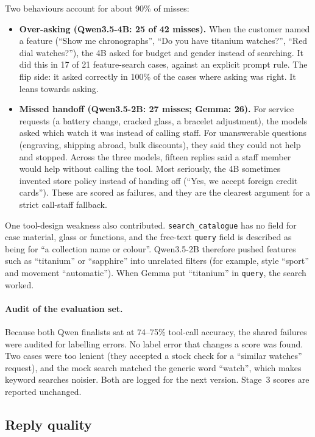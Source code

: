 \documentclass[11pt,a4paper]{article}
\begin{document}
Two behaviours account for about 90\% of misses:
\begin{itemize}
  \item \textbf{Over-asking (Qwen3.5-4B: 25 of 42 misses).} When the customer named a feature (``Show me chronographs'',
        ``Do you have titanium watches?'', ``Red dial watches?''), the 4B asked for budget and gender instead of
        searching. It did this in 17 of 21 feature-search cases, against an explicit prompt rule. The flip side: it
        asked correctly in 100\% of the cases where asking was right. It leans towards asking.
  \item \textbf{Missed handoff (Qwen3.5-2B: 27 misses; Gemma: 26).} For service requests (a battery change, cracked
        glass, a bracelet adjustment), the models asked which watch it was instead of calling staff. For unanswerable
        questions (engraving, shipping abroad, bulk discounts), they said they could not help and stopped. Across the three models, fifteen
        replies said a staff member would help without calling the tool. Most seriously, the 4B sometimes invented
        store policy instead of handing off (``Yes, we accept foreign credit cards''). These are scored as failures,
        and they are the clearest argument for a strict call-staff fallback.
\end{itemize}

One tool-design weakness also contributed. \texttt{search\_catalogue} has no field for case material, glass or
functions, and the free-text \texttt{query} field is described as being for ``a collection name or colour''. Qwen3.5-2B
therefore pushed features such as ``titanium'' or ``sapphire'' into unrelated filters (for example, style ``sport'' and
movement ``automatic''). When Gemma put ``titanium'' in \texttt{query}, the search worked.

\paragraph{Audit of the evaluation set.} Because both Qwen finalists sat at 74--75\% tool-call accuracy, the shared
failures were audited for labelling errors. No label error that changes a score was found. Two cases were too lenient
(they accepted a stock check for a ``similar watches'' request), and the mock search matched the generic word
``watch'', which makes keyword searches noisier. Both are logged for the next version. Stage~3 scores are reported
unchanged.

\subsection{Reply quality}\label{sec:rubric}
\end{document}
